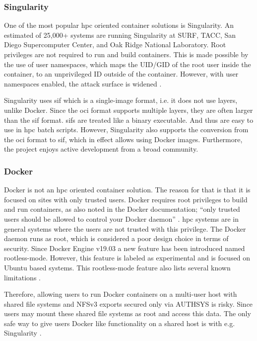 \documentclass[12pt]{article}
\begin{document}
\subsubsection{Singularity}
One of the most popular \gls{hpc} oriented container solutions is Singularity. An estimated of 25,000+ systems are running Singularity at SURF, TACC, San Diego Supercomputer Center, and Oak Ridge National Laboratory. Root privileges are not required to run and build containers. This is made possible by the use of user namespaces, which maps the UID/GID of the root user inside the container, to an unprivileged ID outside of the container. However, with user namespaces enabled, the attack surface is widened \cite{rhel-cve}.

Singularity uses \gls{sif} which is a single-image format, i.e. it does not use layers, unlike Docker. Since the \gls{oci} format supports multiple layers, they are often larger than the \gls{sif} format. \glspl{sif} are treated like a binary executable. And thus are easy to use in \gls{hpc} batch scripts. However, Singularity also supports the conversion from the \gls{oci} format to \gls{sif}, which in effect allows using Docker images. Furthermore, the project enjoys active development from a broad community.


\subsubsection{Docker}
Docker is not an \gls{hpc} oriented container solution. The reason for that is that it is focused on sites with only trusted users. Docker requires root privileges to build and run containers, as also noted in the Docker documentation; ``only trusted users should be allowed to control your Docker daemon'' \cite{docker-security}. \gls{hpc} systems are in general systems where the users are not trusted with this privilege. The Docker daemon runs as root, which is considered a poor design choice in terms of security. Since Docker Engine v19.03 a new feature has been introduced named rootless-mode. However, this feature is labeled as experimental and is focused on Ubuntu based systems. This rootless-mode feature also lists several known limitations \cite{docker-rootless}.

Therefore, allowing users to run Docker containers on a multi-user host with shared file systems and NFSv3 exports secured only via AUTHSYS is risky. Since users may mount these shared file systems as root and access this data. The only safe way to give users Docker like functionality on a shared host is with e.g. Singularity \cite{cloudy-hutch}.
\end{document}

